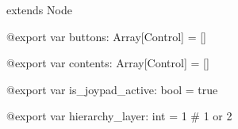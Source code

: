 extends Node

@export var buttons: Array{[}Control{]} = {[}{]}

@export var contents: Array{[}Control{]} = {[}{]}

@export var is\_joypad\_active: bool = true

@export var hierarchy\_layer: int = 1 \# 1 or 2

